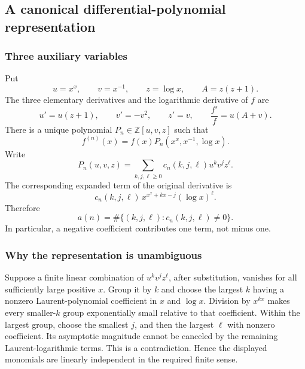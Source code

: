 \documentclass[11pt,a4paper]{article}
\numberwithin{equation}{section}
\theoremstyle{definition}
\theoremstyle{remark}
\theoremstyle{plain}
\newcommand{\Z}{\mathbb Z}
\begin{document}
\subsection{A canonical differential-polynomial representation}

\subsubsection{Three auxiliary variables}
Put
\[
 u=x^x,\qquad v=x^{-1},\qquad z=\log x,\qquad A=z(z+1).
\]
The three elementary derivatives and the logarithmic derivative of $f$ are
\begin{equation}\label{xxc:eq:basicderivatives}
 u'=u(z+1),\qquad v'=-v^2,\qquad z'=v,
 \qquad \frac{f'}{f}=u(A+v).
\end{equation}
There is a unique polynomial $P_n\in\Z[u,v,z]$ such that
\begin{equation}\label{xxc:eq:Pdefinition}
 f^{(n)}(x)=f(x)P_n(x^x,x^{-1},\log x).
\end{equation}
Write
\begin{equation}\label{xxc:eq:coeffdefinition}
 P_n(u,v,z)=\sum_{k,j,\ell\ge0}c_n(k,j,\ell)u^kv^jz^\ell.
\end{equation}
The corresponding expanded term of the original derivative is
\[
 c_n(k,j,\ell)\,x^{x^x+kx-j}(\log x)^\ell.
\]
Therefore
\begin{equation}\label{xxc:eq:count}
 a(n)=\#\{(k,j,\ell):c_n(k,j,\ell)\ne0\}.
\end{equation}
In particular, a negative coefficient contributes one term, not minus one.

\subsubsection{Why the representation is unambiguous}

Suppose a finite linear combination of $u^kv^jz^\ell$, after substitution,
vanishes for all sufficiently large positive $x$. Group it by $k$ and choose
the largest $k$ having a nonzero Laurent-polynomial coefficient in $x$ and
$\log x$. Division by $x^{kx}$ makes every smaller-$k$ group exponentially
small relative to that coefficient. Within the largest group, choose the
smallest $j$, and then the largest $\ell$ with nonzero coefficient. Its
asymptotic magnitude cannot be canceled by the remaining Laurent-logarithmic
terms. This is a contradiction. Hence the displayed monomials are linearly
independent in the required finite sense.
\end{document}
